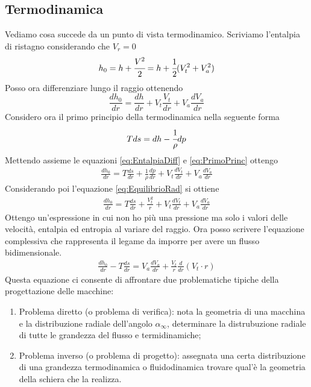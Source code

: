 \subsection{Termodinamica}
Vediamo cosa succede da un punto di vista termodinamico.
Scriviamo l'entalpia di ristagno considerando che $V_r = 0$
\begin{align*}
h_0 = h + \cfrac{V^2}{2} = h + \cfrac{1}{2}(V_t^2 + V_a^2)
\end{align*}
Posso ora differenziare lungo il raggio ottenendo
\begin{equation}
\frac{dh_0}{dr} = \frac{dh}{dr} + V_t \frac{V_t}{dr} + V_a \frac{dV_a}{dr}
\label{eq:EntalpiaDiff}
\end{equation}
Considero ora il primo principio della termodinamica nella seguente forma
\begin{align*}
Tds = dh - \cfrac{1}{\rho} dp
\label{eq:PrimoPrinc}
\end{align*}
Mettendo assieme le equazioni \ref{eq:EntalpiaDiff} e \ref{eq:PrimoPrinc} ottengo
\begin{align*}
\frac{dh_0}{dr} = T \frac{ds}{dr} + \frac{1}{\rho} \frac{dp}{dr} + V_t \frac{dV_t}{dr} + V_a \frac{dV_a}{dr}
\end{align*}
Considerando poi l'equazione \ref{eq:EquilibrioRad} si ottiene
\begin{align*}
\frac{dh_0}{dr} = T \frac{ds}{dr} + \frac{V_t^2}{r} + V_t \frac{dV_t}{dr} + V_a \frac{dV_a}{dr}
\end{align*}
Ottengo un'espressione in cui non ho più una pressione ma solo i valori delle velocità, entalpia ed entropia al variare del raggio.
Ora posso scrivere l'equazione complessiva che rappresenta il legame da imporre per avere un flusso bidimensionale.
\begin{align*}
\boxed{ \frac{dh_0}{dr} - T\frac{ds}{dr} = V_a \frac{dV_a}{dr} + \frac{V_t}{r} \frac{d}{dr}(V_t \cdot r)}
\end{align*}
Questa equazione ci consente di affrontare due problematiche tipiche della progettazione delle macchine:
\begin{enumerate}
\item Problema diretto (o problema di verifica): nota la geometria di una macchina e la distribuzione radiale dell'angolo $\alpha_{\infty}$, determinare la distrubuzione radiale di tutte le grandezza del flusso e termidinamiche;
\item Problema inverso (o problema di progetto): assegnata una certa distribuzione di una grandezza termodinamica o fluidodinamica trovare qual'è la geometria della schiera che la realizza.
\end{enumerate}
